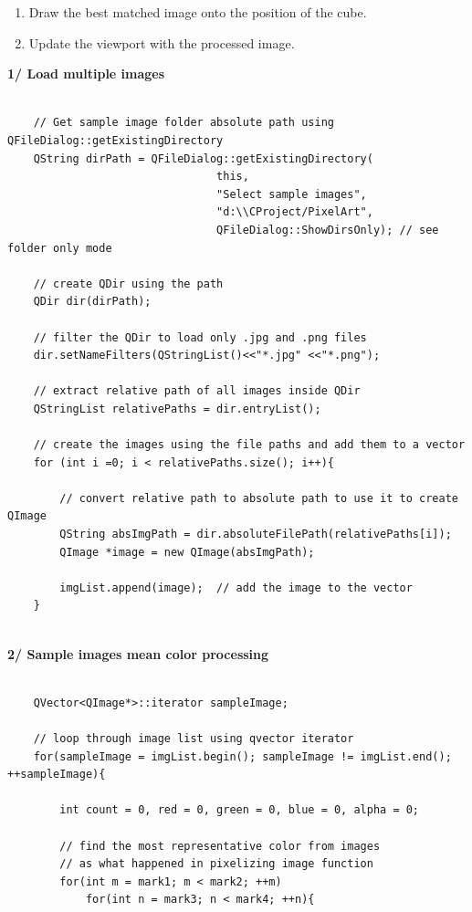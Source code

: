 \documentclass[english]{article}
\begin{document}
{\begin{enumerate}
	\item Draw the best matched image onto the position of the cube.
	
	\item Update the viewport with the processed image. 
	\newline
\end{enumerate} 



\textbf{1/ Load multiple images} \newline

\lstset{language=C++}
\begin{lstlisting}

	// Get sample image folder absolute path using QFileDialog::getExistingDirectory
	QString dirPath = QFileDialog::getExistingDirectory(
								this,
								"Select sample images",
								"d:\\CProject/PixelArt",
								QFileDialog::ShowDirsOnly); // see folder only mode
						
	// create QDir using the path							
	QDir dir(dirPath); 
	
	// filter the QDir to load only .jpg and .png files
	dir.setNameFilters(QStringList()<<"*.jpg" <<"*.png"); 
	
	// extract relative path of all images inside QDir
	QStringList relativePaths = dir.entryList();
	
	// create the images using the file paths and add them to a vector
	for (int i =0; i < relativePaths.size(); i++){
	
		// convert relative path to absolute path to use it to create QImage
		QString absImgPath = dir.absoluteFilePath(relativePaths[i]);
		QImage *image = new QImage(absImgPath);
		
		imgList.append(image);	// add the image to the vector
	}
	
\end{lstlisting}


\textbf{2/ Sample images mean color processing} \newline
\lstset{language=C++}
\begin{lstlisting}

	QVector<QImage*>::iterator sampleImage;
	
	// loop through image list using qvector iterator
	for(sampleImage = imgList.begin(); sampleImage != imgList.end(); ++sampleImage){
	
		int count = 0, red = 0, green = 0, blue = 0, alpha = 0;

		// find the most representative color from images
		// as what happened in pixelizing image function
		for(int m = mark1; m < mark2; ++m)
			for(int n = mark3; n < mark4; ++n){
			

\end{lstlisting}}
\end{document}
